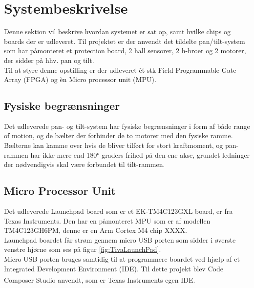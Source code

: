 \section{Systembeskrivelse}
Denne sektion vil beskrive hvordan systemet er sat op, samt hvilke chips og boards der er udleveret.
Til projektet er der anvendt det tildelte pan/tilt-system som har påmonteret et protection board, 2 hall sensorer, 2 h-broer og 2 motorer, der sidder på hhv. pan og tilt.\\
Til at styre denne opstilling er der udleveret èt stk Field Programmable Gate Array (FPGA) og èn Micro processor unit (MPU).
\\

\subsection{Fysiske begrænsninger}

Det udleverede pan- og tilt-system har fysiske begrænsninger i form af både range of motion, og de bælter der forbinder de to motorer med den fysiske ramme. Bælterne kan kamme over hvis de bliver tilført for stort kraftmoment, og pan-rammen har ikke mere end 180° graders frihed på den ene akse, grundet ledninger der nødvendigvis skal være forbundet til tilt-rammen.

\subsection{Micro Processor Unit}
Det udleverede Launchpad board som er et EK-TM4C123GXL board, er fra Texas Instruments. Den har en påmonteret MPU som er af modellen TM4C123GH6PM, denne er en Arm Cortex M4 chip \cite{TM4C123GH6PMDatasheet}XXXX.\\
Launchpad boardet får strøm gennem micro USB porten som sidder i øverste venstre hjørne som ses på figur \ref{fig:TivaLaunchPad}.\\
Micro USB porten bruges samtidig til at programmere boardet ved hjælp af et Integrated Development Environment (IDE). Til dette projekt blev Code Composer Studio \textsuperscript{\texttrademark} anvendt, som er Texas Instruments egen IDE.

